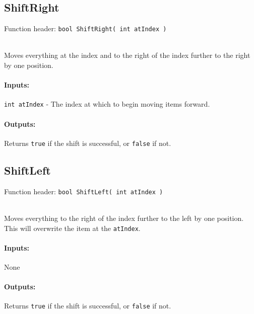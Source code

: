     \begin{framed}
    \subsection{ShiftRight}

    Function header: \texttt{bool ShiftRight( int atIndex )}

    ~\\ Moves everything at the index and to the right of the index further to the right by one position.

    \paragraph{Inputs:}
        \texttt{int atIndex} - The index at which to begin moving items forward.

    \paragraph{Outputs:}
        Returns \texttt{true} if the shift is successful, or \texttt{false} if not.

    \end{framed}
    
    \begin{framed}
    \subsection{ShiftLeft}

    Function header: \texttt{bool ShiftLeft( int atIndex )}

    ~\\ Moves everything to the right of the index further to the left by one position.
    This will overwrite the item at the \texttt{atIndex}.

    \paragraph{Inputs:}
        None

    \paragraph{Outputs:}
        Returns \texttt{true} if the shift is successful, or \texttt{false} if not.

    \end{framed}

